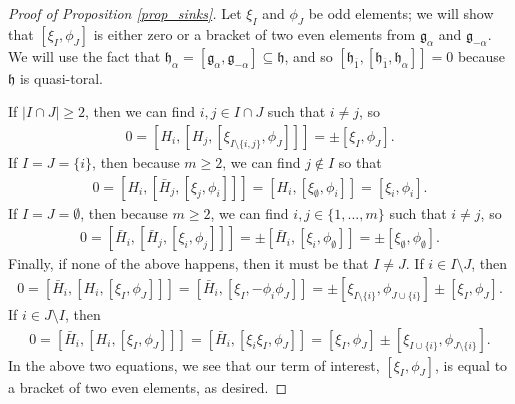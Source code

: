 \documentclass[12pt, a4paper, reqno]{amsart}
\def\h{\mathfrak{h}}
\def\ol{\overline}
\theoremstyle{definition}
\theoremstyle{definition}
\theoremstyle{definition}
\numberwithin{theorem}{section}
\numberwithin{lemma}{section}
\numberwithin{remark}{section}
\numberwithin{definition}{section}
\numberwithin{corollary}{section}
\numberwithin{proposition}{section}
\numberwithin{example}{section}
\begin{document}
\begin{proof}[Proof of Proposition \ref{prop_sinks}]
		Let \(\xi_I\) and \(\phi_J\) be odd elements; we will show that \([\xi_I,\phi_J]\) is either zero or a bracket of two even elements  from \(\mathfrak{g}_{\alpha}\) and \(\mathfrak{g}_{-\alpha}\). We will use the fact that \(\h_{\alpha} = [\mathfrak{g}_{\alpha},\mathfrak{g}_{-\alpha}] \subseteq \mathfrak{h}\), and so \([\mathfrak{h}_{\ol{1}},[\mathfrak{h}_{\ol{1}},\mathfrak{h}_{\alpha}]] = 0\) because \(\mathfrak{h}\) is quasi-toral. 
		
		If \(\lvert I\cap J\rvert\geq 2\), then we can find \(i,j \in I\cap J\) such that \(i\neq j\), so
		\begin{align*}
			0 = [H_i,[H_j,[\xi_{I\setminus\{i,j\}},\phi_J]]] = \pm [\xi_I,\phi_J]. 
		\end{align*}
		If \(I=J=\{i\}\), then because \(m\geq2\), we can find \(j\notin I\) so that
		\begin{align*}
			0=[H_i,[\bar{H}_j,[\xi_j,\phi_i]]] = [H_i,[\xi_\emptyset,\phi_i]] = [\xi_i,\phi_i]. 
		\end{align*}
		If \(I=J=\emptyset\), then because \(m\geq 2\), we can find \(i,j \in \{1,...,m\}\) such that \(i\neq j\), so
		\begin{align*}
			0 = [\bar{H}_i,[\bar{H}_j,[\xi_i,\phi_j]]] = \pm [\bar{H}_i,[\xi_i,\phi_{\emptyset}]] = \pm [\xi_\emptyset,\phi_\emptyset].
		\end{align*}
		Finally, if none of the above happens, then it must be that \(I\neq J\). If \(i \in I\setminus J\), then
		\begin{align*}
			0 = [\bar{H}_i,[H_i,[\xi_I,\phi_J]]] = [\bar{H}_i,[\xi_I,-\phi_i\phi_J]] = \pm[\xi_{I\setminus\{i\}},\phi_{J\cup\{i\}}] \pm [\xi_I,\phi_J].
		\end{align*}
		If \(i \in J\setminus I\), then
		\begin{align*}
			0 = [\bar{H}_i,[H_i,[\xi_I,\phi_J]]] = [\bar{H}_i,[\xi_i\xi_I,\phi_J]] = [\xi_I,\phi_J] \pm [\xi_{I\cup\{i\}},\phi_{J\setminus\{i\}}].
		\end{align*}
		In the above two equations, we see that our term of interest, \([\xi_I,\phi_J]\), is equal to a bracket of two even elements, as desired.
		

\end{proof}
\end{document}

